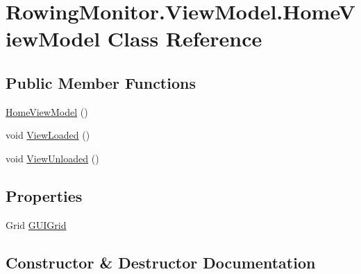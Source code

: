 \hypertarget{class_rowing_monitor_1_1_view_model_1_1_home_view_model}{}\section{Rowing\+Monitor.\+View\+Model.\+Home\+View\+Model Class Reference}
\label{class_rowing_monitor_1_1_view_model_1_1_home_view_model}
\subsection*{Public Member Functions}
\begin{DoxyCompactItemize}
\item 
\hyperlink{class_rowing_monitor_1_1_view_model_1_1_home_view_model_a6aeb83011dc7837b14abb2dac7e56aaa}{Home\+View\+Model} ()
\item 
void \hyperlink{class_rowing_monitor_1_1_view_model_1_1_home_view_model_ab20700b532293270bc43551ddcc783c6}{View\+Loaded} ()
\item 
void \hyperlink{class_rowing_monitor_1_1_view_model_1_1_home_view_model_adea01e64945f13fb6beafb3804b8fd6d}{View\+Unloaded} ()
\end{DoxyCompactItemize}
\subsection*{Properties}
\begin{DoxyCompactItemize}
\item 
Grid \hyperlink{class_rowing_monitor_1_1_view_model_1_1_home_view_model_a6a13d06451d7375e39108c273022cef4}{G\+U\+I\+Grid}
\end{DoxyCompactItemize}


\subsection{Constructor \& Destructor Documentation}
\mbox{\label{class_rowing_monitor_1_1_view_model_1_1_home_view_model_a6aeb83011dc7837b14abb2dac7e56aaa}} 
